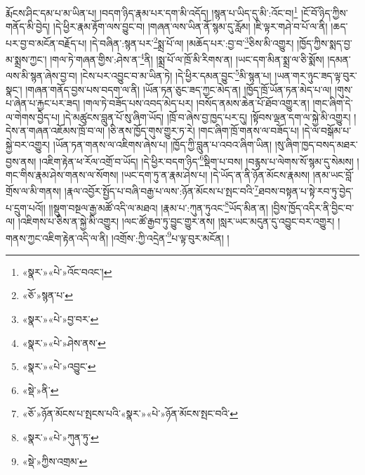 རྨོངས་ཤིང་དམ་པ་མ་ཡིན་པ། །བདག་ཉིད་རྣམ་པར་དག་མི་འདོད། །སྙན་པ་ཡིད་དུ་མི་:འོང་བ།\footnote{«སྣར་»«པེ་»འོང་བའང་།} །ངོ་བོ་ཉིད་ཀྱིས་གནོད་མི་བྱེད། །དེ་ཕྱིར་རྣམ་རྟོག་ལས་བྱུང་བ། །གཞན་ལས་ཡིན་ནོ་སྙམ་དུ་རློམ། །ཇི་ལྟར་གཤེ་བ་པོ་ལ་ནི། །ཆད་པར་བྱ་བ་མངོན་བརྗོད་པ། །དེ་བཞིན་:སྙན་པར་\footnote{«ཅོ་»སྙན་པ་}སྨྲ་པོ་ལ། །མཆོད་པར་:བྱ་བ་\footnote{«སྣར་»«པེ་»བྱ་བར་}ཅིས་མི་འགྱུར། །ཁྱོད་ཀྱིས་སྨད་བྱ་མ་སྨྲས་ཀྱང་། །གལ་ཏེ་གཞན་གྱིས་:ཤེས་ན་\footnote{«སྣར་»«པེ་»ཤེས་ནས་}ནི། །སྨྲ་པོ་ལ་ཁྲོ་མི་རིགས་ན། །ཡང་དག་མིན་སྨྲ་ལ་ཅི་སྨོས། །དམན་ལས་མི་སྙན་ཞེས་བྱ་བ། །ངེས་པར་འབྱུང་བ་མ་ཡིན་ཏེ། །དེ་ཕྱིར་དམན་བྱུང་\footnote{«སྣར་»«པེ་»འབྱུང་}མི་སྙན་པ། །ཡན་གར་ཉུང་ཟད་ལྟ་བུར་སྣང་། །གཞན་གནོད་བྱས་པས་བདག་ལ་ནི། །ཡོན་ཏན་ཅུང་ཟད་ཀྱང་མེད་ན། །ཁྱོད་ཁྲོ་ཡོན་ཏན་མེད་པ་ལ། །གུས་པ་ཞེན་པ་རྐྱང་པར་ཟད། །གལ་ཏེ་བཟོད་པས་འབད་མེད་པར། །བསོད་ནམས་ཆེན་པོ་ཐོབ་འགྱུར་ན། །གང་ཞིག་དེ་ལ་གེགས་བྱེད་པ། །དེ་མཚུངས་བླུན་པོ་སུ་ཞིག་ཡོད། །ཁྲོ་བ་ཞེས་བྱ་ཁྱད་པར་དུ། །སྟོབས་ལྡན་དག་ལ་སྐྱེ་མི་འགྱུར། །དེས་ན་གཞན་འཇོམས་ཁྲོ་བ་ལ། །ཅི་ནས་ཁྱོད་གུས་གྱུར་ཏ་རེ། །གང་ཞིག་ཁྲོ་གནས་ལ་བཟོད་པ། །དེ་ལ་བསྒོམ་པ་སྐྱེ་བར་འགྱུར། །ཡོན་ཏན་གནས་ལ་འཇིགས་ཞེས་པ། །ཁྱོད་ཀྱི་བླུན་པ་འབའ་ཞིག་ཡིན། །སུ་ཞིག་ཁྱད་བསད་མཐར་བྱས་ནས། །འཇིག་རྟེན་ཕ་རོལ་འགྲོ་བ་ཡོད། །དེ་ཕྱིར་བདག་ཉིད་\footnote{«སྡེ་»ནི་}སྡིག་པ་བས། །བརྙས་པ་ལེགས་སོ་སྙམ་དུ་སེམས། །གང་གིས་རྣམ་ཤེས་གནས་ལ་སོགས། །ཡང་དག་ཏུ་ན་རྣམ་ཤེས་པ། །དེ་ཡོད་ན་ནི་ཉོན་མོངས་རྣམས། །ནམ་ཡང་བློ་གྲོས་ལ་མི་གནས། །རྣལ་འབྱོར་སྤྱོད་པ་བཞི་བརྒྱ་པ་ལས་:ཉོན་མོངས་པ་སྤང་བའི་\footnote{«ཅོ་»ཉོན་མོངས་པ་སྤངས་པའི་«སྣར་»«པེ་»ཉོན་མོངས་སྤང་བའི་}ཐབས་བསྟན་པ་སྟེ་རབ་ཏུ་བྱེད་པ་དྲུག་པའོ།། །།སྡུག་བསྔལ་རྒྱ་མཚོ་འདི་ལ་མཐའ། །རྣམ་པ་:ཀུན་ཏུའང་\footnote{«སྣར་»«པེ་»ཀུན་ཏུ་}ཡོད་མིན་ན། །བྱིས་ཁྱོད་འདིར་ནི་བྱིང་བ་ལ། །འཇིགས་པ་ཅིས་ན་སྐྱེ་མི་འགྱུར། །ལང་ཚོ་རྒྱབ་ཏུ་བྱུང་གྱུར་ནས། །སླར་ཡང་མདུན་དུ་འབྱུང་བར་འགྱུར། །གནས་ཀྱང་འཇིག་རྟེན་འདི་ལ་ནི། །འགྲོས་:ཀྱི་འདྲེན་\footnote{«སྡེ་»ཀྱིས་འགྲམ་}པ་ལྟ་བུར་མངོན། །
